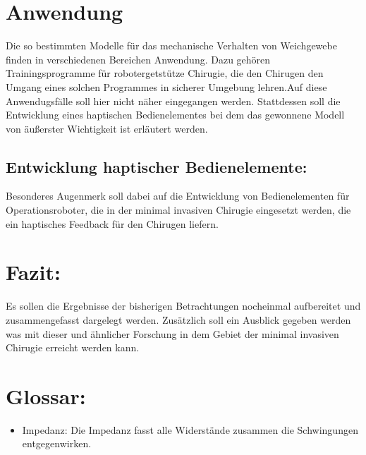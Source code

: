 \documentclass[11pt]{article}
\begin{document}
	\section{Anwendung}
		Die so bestimmten Modelle für das mechanische Verhalten von Weichgewebe finden in 
		verschiedenen Bereichen Anwendung. Dazu gehören Trainingsprogramme für robotergetstütze
		Chirugie, die den Chirugen den Umgang eines solchen Programmes in sicherer Umgebung 
		lehren.Auf diese Anwendugsfälle soll hier nicht näher eingegangen werden. Stattdessen
		soll die Entwicklung eines haptischen Bedienelementes bei dem das gewonnene Modell von
		äußerster Wichtigkeit ist erläutert werden.
		 
		\subsection{Entwicklung haptischer Bedienelemente:}
			Besonderes Augenmerk soll dabei auf die Entwicklung von Bedienelementen für 
			Operationsroboter, die in der minimal invasiven Chirugie eingesetzt werden, die 
			ein haptisches Feedback für den Chirugen liefern.

			
	\section{Fazit:}
			Es sollen die Ergebnisse der bisherigen Betrachtungen nocheinmal aufbereitet und 
			zusammengefasst dargelegt werden. Zusätzlich soll ein Ausblick gegeben werden was 
			mit dieser und ähnlicher Forschung in dem Gebiet der minimal invasiven Chirugie erreicht
			werden kann. 
			
	\section{Glossar:}
	\begin{itemize}
		\item Impedanz: Die Impedanz fasst alle Widerstände zusammen die Schwingungen entgegenwirken.
	\end{itemize}
			 
		  
\end{document}
